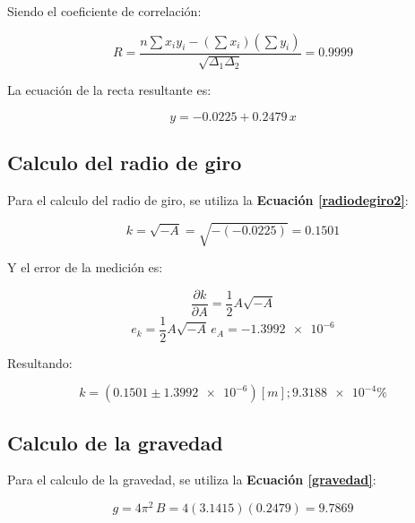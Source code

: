 \documentclass[letter,11pt]{article}
\begin{document}
Siendo el coeficiente de correlación:

\begin{equation*}
    R = \frac{n \sum x_i y_i - (\sum x_i)(\sum y_i)}{\sqrt{\Delta_1 \Delta_2}} = 0.9999
\end{equation*}
\vspace{0.10cm}

La ecuación de la recta resultante es:

\begin{equation*}
    y = -0.0225 + 0.2479\,x
\end{equation*}
\vspace{0.10cm}

\subsection{Calculo del radio de giro}

Para el calculo del radio de giro, se utiliza la \textbf{Ecuación \ref{radiodegiro2}}:

\begin{equation*}
    k = \sqrt{-A} = \sqrt{-(-0.0225)} = 0.1501
\end{equation*}
\vspace{0.10cm}

Y el error de la medición es:

\begin{equation*}
    \frac{\partial k}{\partial A} = \frac{1}{2} A \sqrt{-A}
\end{equation*}
\begin{equation*}
    e_k = \frac{1}{2} A \sqrt{-A}\,e_A = \num{-1.3992e-6}
\end{equation*}
\vspace{0.10cm}

Resultando:

\begin{equation*}
    k = (0.1501 \pm \num{1.3992e-6}) [m]; \num{9.3188e-4}\%
\end{equation*}
\vspace{0.10cm}

\subsection{Calculo de la gravedad}

Para el calculo de la gravedad, se utiliza la \textbf{Ecuación \ref{gravedad}}:

\begin{equation*}
    g = 4 \pi^2\, B = 4 (3.1415) (0.2479) = 9.7869
\end{equation*}
\vspace{0.10cm}
\end{document}
